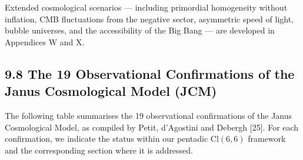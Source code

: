 \documentclass[11pt]{article}
\begin{document}
Extended cosmological scenarios --- including primordial homogeneity
without inflation, CMB fluctuations from the negative sector, asymmetric
speed of light, bubble universes, and the accessibility of the Big Bang
--- are developed in Appendices W and X.

\hypertarget{the-19-observational-confirmations-of-the-janus-cosmological-model-jcm}{%
\subsection{9.8 The 19 Observational Confirmations of the Janus
Cosmological Model
(JCM)}\label{the-19-observational-confirmations-of-the-janus-cosmological-model-jcm}}

The following table summarises the 19 observational confirmations of the
Janus Cosmological Model, as compiled by Petit, d'Agostini and Debergh
{[}25{]}. For each confirmation, we indicate the status within our
pentadic \(\text{Cl}(6,6)\) framework and the corresponding section
where it is addressed.
\end{document}
